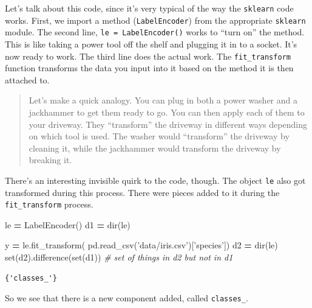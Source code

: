 \documentclass[
  letterpaper,
]{scrbook}
\newenvironment{Shaded}{\begin{snugshade}}{\end{snugshade}}
\newcommand{\BuiltInTok}[1]{#1}
\newcommand{\CommentTok}[1]{\textcolor[rgb]{0.56,0.35,0.01}{\textit{#1}}}
\newcommand{\NormalTok}[1]{#1}
\newcommand{\OperatorTok}[1]{\textcolor[rgb]{0.81,0.36,0.00}{\textbf{#1}}}
\newcommand{\StringTok}[1]{\textcolor[rgb]{0.31,0.60,0.02}{#1}}
\begin{document}
Let's talk about this code, since it's very typical of the way the \texttt{sklearn}
code works. First, we import a method (\texttt{LabelEncoder}) from the appropriate
\texttt{sklearn} module. The second line, \texttt{le\ =\ LabelEncoder()} works to ``turn on'' the
method. This is like taking a power tool off the shelf and plugging it in to a
socket. It's now ready to work. The third line does the actual work. The
\texttt{fit\_transform} function transforms the data you input into it based on the
method it is then attached to.

\begin{quote}
Let's make a quick analogy. You can plug in both a power washer and a
jackhammer to get them ready to go. You can then apply each of them to your
driveway. They ``transform'' the driveway in different ways depending on which
tool is used. The washer would ``transform'' the driveway by cleaning it, while
the jackhammer would transform the driveway by breaking it.
\end{quote}

There's an interesting invisible quirk to the code, though. The object \texttt{le} also got transformed during this
process. There were pieces added to it during the \texttt{fit\_transform} process.

\begin{Shaded}
\begin{Highlighting}[]
\NormalTok{le }\OperatorTok{=}\NormalTok{ LabelEncoder()}
\NormalTok{d1 }\OperatorTok{=} \BuiltInTok{dir}\NormalTok{(le)}
\end{Highlighting}
\end{Shaded}

\begin{Shaded}
\begin{Highlighting}[]
\NormalTok{y }\OperatorTok{=}\NormalTok{ le.fit_transform( pd.read_csv(}\StringTok{'data/iris.csv'}\NormalTok{)[}\StringTok{'species'}\NormalTok{])}
\NormalTok{d2 }\OperatorTok{=} \BuiltInTok{dir}\NormalTok{(le)}
\BuiltInTok{set}\NormalTok{(d2).difference(}\BuiltInTok{set}\NormalTok{(d1)) }\CommentTok{# set of things in d2 but not in d1}
\end{Highlighting}
\end{Shaded}

\begin{verbatim}
{'classes_'}
\end{verbatim}

So we see that there is a new component added, called \texttt{classes\_}.
\end{document}
